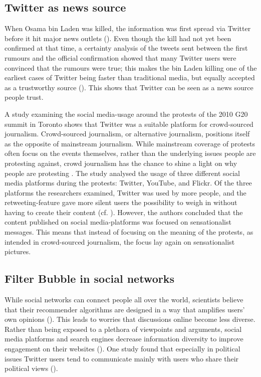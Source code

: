 \subsection{Twitter as news source}  %
When Osama bin Laden was killed, the information was first spread via Twitter before it hit major news outlets (\cite{hu2012breaking}). 
Even though the kill had not yet been confirmed at that time, a certainty analysis of the tweets sent between the first rumours and the official confirmation showed that many Twitter users were convinced that the rumours were true; this makes the bin Laden killing one of the earliest cases of Twitter being faster than traditional media, but equally accepted as a trustworthy source (\cite[2751]{hu2012breaking}). This shows that Twitter can be seen as a news source people trust.

A study examining the social media-usage around the protests of the 2010 G20 summit in Toronto shows that Twitter was a suitable platform for crowd-sourced journalism\cite{poell2012twitter}. Crowd-sourced journalism, or alternative journalism, positions itself as the opposite of mainstream journalism. While mainstream coverage of protests often focus on the events themselves, rather than the underlying issues people are protesting against, crowd journalism has the chance to shine a light on why people are protesting \cite[698]{poell2012twitter}. The study analysed the usage of three different social media platforms during the protests: Twitter, YouTube, and Flickr. Of the three platforms the researchers examined, Twitter was used by more people, and the retweeting-feature gave more silent users the possibility to weigh in without having to create their content (cf. \cite[709]{poell2012twitter}). However, the authors concluded that the content published on social media-platforms was focused on sensationalist messages. This means that instead of focusing on the meaning of the protests, as intended in crowd-sourced journalism, the focus lay again on sensationalist pictures.

\subsection{Filter Bubble in social networks}
While social networks can connect people all over the world, scientists believe that their recommender algorithms are designed in a way that amplifies users' own opinions (\cite{pariser2011filter}). This leads to worries that discussions online become less diverse. Rather than being exposed to a plethora of viewpoints and arguments, social media platforms and search engines decrease information diversity to improve engagement on their websites (\cite{bozdag2015}). One study found that especially in political issues Twitter users tend to communicate mainly with users who share their political views (\cite{barbera2015}).


